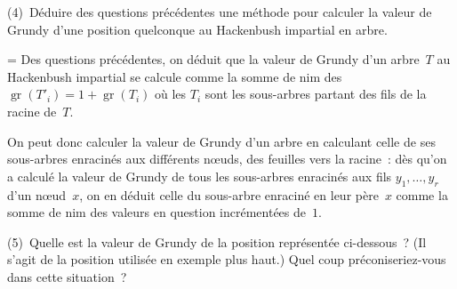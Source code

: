 \documentclass[12pt,a4paper]{article}
\theoremstyle{definition}
\newcommand{\gr}{\operatorname{gr}}
\newif\ifcorrige
\newenvironment{corrige}%
{\ifcorrige\relax\else\setbox0=\vbox\bgroup\fi%
\smallbreak\noindent{\underbar{\textit{Corrigé.}}\quad}}
{{\hbox{}\nobreak\hfill\checkmark}%
\ifcorrige\relax\else\egroup\fi\par}
\begin{document}
\smallbreak

(4) Déduire des questions précédentes une méthode pour calculer la
valeur de Grundy d'une position quelconque au Hackenbush impartial en
arbre.

\begin{corrige}
Des questions précédentes, on déduit que la valeur de Grundy d'un
arbre $T$ au Hackenbush impartial se calcule comme la somme de nim des
$\gr(T'_i) = 1+\gr(T_i)$ où les $T_i$ sont les sous-arbres partant des
fils de la racine de $T$.

On peut donc calculer la valeur de Grundy d'un arbre en calculant
celle de ses sous-arbres enracinés aux différents nœuds, des feuilles
vers la racine : dès qu'on a calculé la valeur de Grundy de tous les
sous-arbres enracinés aux fils $y_1,\ldots,y_r$ d'un nœud $x$, on en
déduit celle du sous-arbre enraciné en leur père $x$ comme la somme de
nim des valeurs en question incrémentées de $1$.
\end{corrige}

\smallbreak

(5) Quelle est la valeur de Grundy de la position représentée
ci-dessous ?  (Il s'agit de la position utilisée en exemple plus
haut.)  Quel coup préconiseriez-vous dans cette situation ?

\begin{center}
\end{center}
\end{document}
